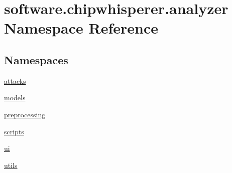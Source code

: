 \hypertarget{namespacesoftware_1_1chipwhisperer_1_1analyzer}{}\section{software.\+chipwhisperer.\+analyzer Namespace Reference}
\label{namespacesoftware_1_1chipwhisperer_1_1analyzer}
\subsection*{Namespaces}
\begin{DoxyCompactItemize}
\item 
 \hyperlink{namespacesoftware_1_1chipwhisperer_1_1analyzer_1_1attacks}{attacks}
\item 
 \hyperlink{namespacesoftware_1_1chipwhisperer_1_1analyzer_1_1models}{models}
\item 
 \hyperlink{namespacesoftware_1_1chipwhisperer_1_1analyzer_1_1preprocessing}{preprocessing}
\item 
 \hyperlink{namespacesoftware_1_1chipwhisperer_1_1analyzer_1_1scripts}{scripts}
\item 
 \hyperlink{namespacesoftware_1_1chipwhisperer_1_1analyzer_1_1ui}{ui}
\item 
 \hyperlink{namespacesoftware_1_1chipwhisperer_1_1analyzer_1_1utils}{utils}
\end{DoxyCompactItemize}
